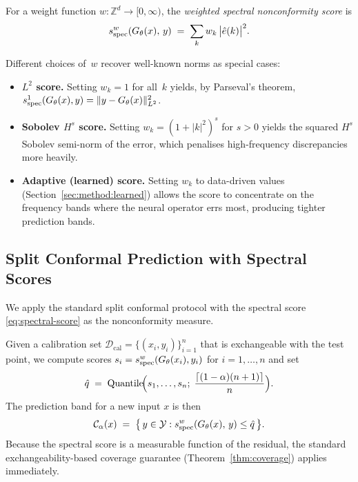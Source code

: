 \begin{definition}
\label{def:spectral-score}
For a weight function $w : \mathbb{Z}^d \to [0, \infty)$, the
\emph{weighted spectral nonconformity score} is
\begin{equation}
  \label{eq:spectral-score}
  s_{\mathrm{spec}}^{w}(G_\theta(x),\, y)
  \;=\; \sum_{k} w_k \,\bigl|\hat{e}(k)\bigr|^2.
\end{equation}
\end{definition}

Different choices of~$w$ recover well-known norms as special cases:
\begin{itemize}
  \item \textbf{$L^2$ score.}  Setting $w_k = 1$ for all~$k$ yields, by
    Parseval's theorem,
    $s_{\mathrm{spec}}^{1}(G_\theta(x), y) = \|y - G_\theta(x)\|_{L^2}^2$.
  \item \textbf{Sobolev $H^s$ score.}  Setting
    $w_k = (1 + |k|^2)^{s}$ for $s > 0$ yields the squared $H^s$
    Sobolev semi-norm of the error, which penalises high-frequency
    discrepancies more heavily.
  \item \textbf{Adaptive (learned) score.}  Setting $w_k$ to
    data-driven values (Section~\ref{sec:method:learned}) allows the
    score to concentrate on the frequency bands where the neural operator
    errs most, producing tighter prediction bands.
\end{itemize}

\subsection{Split Conformal Prediction with Spectral Scores}
\label{sec:method:conformal}

We apply the standard split conformal protocol
\citep{vovk2005algorithmic,lei2018distribution} with the spectral score
\eqref{eq:spectral-score} as the nonconformity measure.

Given a calibration set $\mathcal{D}_{\mathrm{cal}} = \{(x_i, y_i)\}_{i=1}^{n}$
that is exchangeable with the test point, we compute scores
$s_i = s_{\mathrm{spec}}^{w}(G_\theta(x_i), y_i)$ for $i = 1, \dots, n$ and set
\begin{equation}
  \label{eq:quantile}
  \hat{q} \;=\; \mathrm{Quantile}\!\Bigl(
    s_1, \dots, s_n;\;
    \frac{\lceil (1-\alpha)(n+1) \rceil}{n}
  \Bigr).
\end{equation}
The prediction band for a new input $x$ is then
\begin{equation}
  \label{eq:pred-band}
  \mathcal{C}_\alpha(x)
  \;=\;
  \bigl\{\, y \in \mathcal{Y} : s_{\mathrm{spec}}^{w}(G_\theta(x),\, y) \leq \hat{q} \,\bigr\}.
\end{equation}
Because the spectral score is a measurable function of the residual, the
standard exchangeability-based coverage guarantee
(Theorem~\ref{thm:coverage}) applies immediately.

